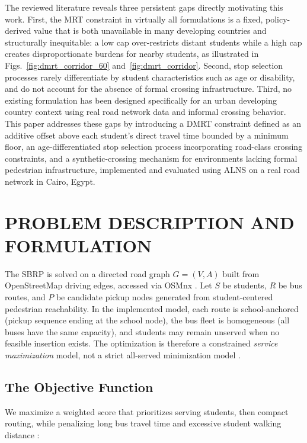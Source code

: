 \documentclass[journal]{IEEEtran}
\begin{document}
The reviewed literature reveals three persistent gaps directly 
motivating this work. First, the MRT constraint in virtually all 
formulations is a fixed, policy-derived value that is both 
unavailable in many developing countries and structurally inequitable: a low cap over-restricts distant 
students while a high cap creates disproportionate burdens for nearby 
students, as illustrated in Figs.~\ref{fig:dmrt_corridor_60} 
and~\ref{fig:dmrt_corridor}. Second, stop selection processes 
rarely differentiate by student characteristics such as age or 
 disability, and do not account for the absence of formal 
crossing infrastructure. Third, no existing formulation has been 
designed specifically for an urban 
developing country context using real road network data and informal crossing behavior. This paper 
addresses these gaps by introducing a DMRT constraint defined as an 
additive offset above each student's direct travel time 
bounded by a minimum floor, an age-differentiated stop selection 
process incorporating road-class crossing constraints, and a 
synthetic-crossing mechanism for environments lacking formal 
pedestrian infrastructure, implemented and evaluated using ALNS on 
a real road network in Cairo, Egypt.

\section{PROBLEM DESCRIPTION AND FORMULATION}

The SBRP is solved on a directed road graph $G=(V,A)$ built from 
OpenStreetMap driving edges, accessed via OSMnx \cite{c8}. 
Let $S$ be students, $R$ be bus routes, and $P$ be candidate pickup 
nodes generated from student-centered pedestrian reachability. In the 
implemented model, each route is school-anchored (pickup sequence 
ending at the school node), the bus fleet is homogeneous (all buses 
have the same capacity), and students may remain unserved when no 
feasible insertion exists. The optimization is therefore a constrained 
\textit{service maximization} model, not a strict all-served 
minimization model \cite{c1}.

\subsection{The Objective Function}

We maximize a weighted score that prioritizes serving students, then 
compact routing, while penalizing long bus travel time and excessive 
student walking distance \cite{c14}:
\end{document}
